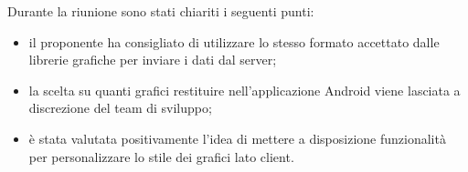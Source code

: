 Durante la riunione sono stati chiariti i seguenti punti:
\begin{itemize}
\item il proponente ha consigliato di utilizzare lo stesso formato accettato dalle librerie grafiche per inviare i dati dal server;
\item la scelta su quanti grafici restituire nell'applicazione Android viene lasciata a discrezione del team di sviluppo;
\item è stata valutata positivamente l'idea di mettere a disposizione funzionalità per personalizzare lo stile dei grafici lato client.
\end{itemize}
